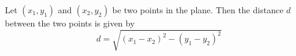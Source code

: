 \begin{frame}
\begin{theorem}
Let $(x_1,y_1)$ and $(x_2, y_2)$ be two points in the plane. Then the distance $d$ between the two points is given by
\[
d=\sqrt{(x_1-x_2)^2-(y_1-y_2)^2}
\]
\end{theorem}

\end{frame}